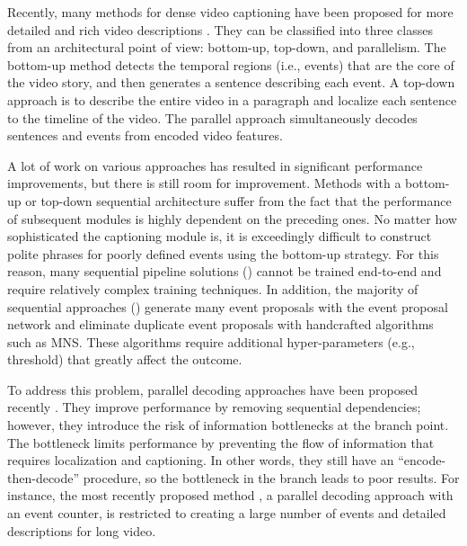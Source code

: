 Recently, many methods for dense video captioning have been proposed for more detailed and rich video descriptions \cite{krishna2017dense,li2018jointly,wang2018bidirectional,zhou2018end,mun2019streamlined,deng2021sketch,wang2021end}.
They can be classified into three classes from an architectural point of view: bottom-up, top-down, and parallelism.
The bottom-up method detects the temporal regions (i.e., events) that are the core of the video story, and then generates a sentence describing each event.
A top-down approach is to describe the entire video in a paragraph and localize each sentence to the timeline of the video.
The parallel approach simultaneously decodes sentences and events from encoded video features.

A lot of work on various approaches has resulted in significant performance improvements, but there is still room for improvement.
Methods with a bottom-up or top-down sequential architecture suffer from the fact that the performance of subsequent modules is highly dependent on the preceding ones.
No matter how sophisticated the captioning module is, it is exceedingly difficult to construct polite phrases for poorly defined events using the bottom-up strategy.
For this reason, many sequential pipeline solutions (\cite{krishna2017dense,li2018jointly,wang2018bidirectional,mun2019streamlined,deng2021sketch}) cannot be trained end-to-end and require relatively complex training techniques.
In addition, the majority of sequential approaches (\cite{krishna2017dense,li2018jointly,wang2018bidirectional,zhou2018end,mun2019streamlined,wang2020event}) generate many event proposals with the event proposal network and eliminate duplicate event proposals with handcrafted algorithms such as MNS.
These algorithms require additional hyper-parameters (e.g., threshold) that greatly affect the outcome.

To address this problem, parallel decoding approaches have been proposed recently \cite{wang2021end}.
They improve performance by removing sequential dependencies; however, they introduce the risk of information bottlenecks at the branch point. 
The bottleneck limits performance by preventing the flow of information that requires localization and captioning.
In other words, they still have an ``encode-then-decode'' procedure, so the bottleneck in the branch leads to poor results.
For instance, the most recently proposed method \cite{wang2021end}, a parallel decoding approach with an event counter, is restricted to creating a large number of events and detailed descriptions for long video.


